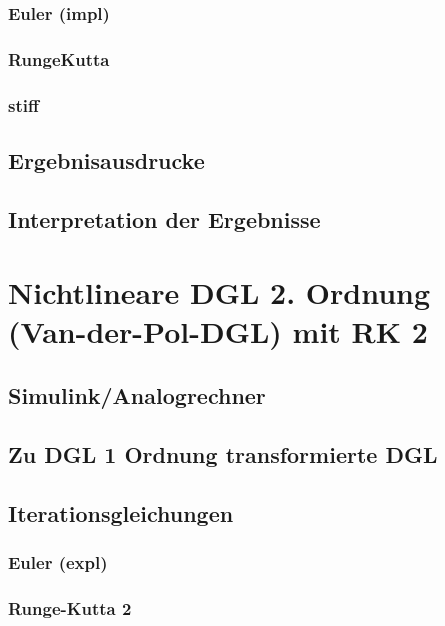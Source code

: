 \documentclass[10pt]{scrartcl}
\begin{document}
		\subsubsection{Euler (impl)}
				
		
		\subsubsection{Runge\-Kutta}
				
		
		\subsubsection{stiff}		
		
	\subsection{Ergebnisausdrucke}	
		
	\subsection{Interpretation der Ergebnisse}		
		

\section{Nichtlineare DGL 2. Ordnung (Van-der-Pol-DGL) mit RK 2}
	\subsection{Simulink/Analogrechner}
	
	\subsection{Zu DGL 1 Ordnung transformierte DGL}
	
	\subsection{Iterationsgleichungen}
		\subsubsection{Euler (expl)}	
	
		\subsubsection{Runge-Kutta 2}	
		
\end{document}

